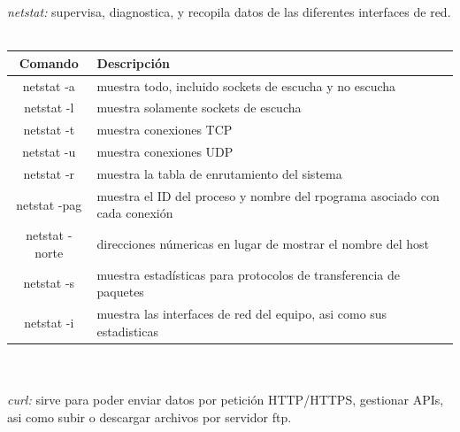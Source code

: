 \documentclass[10pt,a4paper,titlepage]{article}
\begin{document}
	\emph{netstat:} supervisa, diagnostica, y recopila datos de las diferentes interfaces de red.
	\\
	\\
	\begin{tabular}{|c|p{8cm}|}
		\hline
		Comando & Descripción \\
		\hline
		netstat -a & muestra todo, incluido sockets de escucha y no escucha \\
		\hline
		netstat -l & muestra solamente sockets de escucha \\
		\hline
		netstat -t & muestra conexiones TCP \\
		\hline
		netstat -u & muestra conexiones UDP \\
		\hline
		netstat -r & muestra la tabla de enrutamiento del sistema \\
		\hline
		netstat -pag & muestra el ID del proceso y nombre del rpograma asociado con cada conexión \\
		\hline
		netstat -norte & direcciones númericas en lugar de mostrar el nombre del host \\
		\hline
		netstat -s & muestra estadísticas para protocolos de transferencia de paquetes \\
		\hline
		netstat -i & muestra las interfaces de red del equipo, asi como sus estadisticas \\
		\hline
	\end{tabular}
	\\
	\\
	\emph{curl:} sirve para poder enviar datos por petición HTTP/HTTPS, gestionar APIs, asi como subir o descargar archivos por servidor ftp.
	\\
	\\
\end{document}
